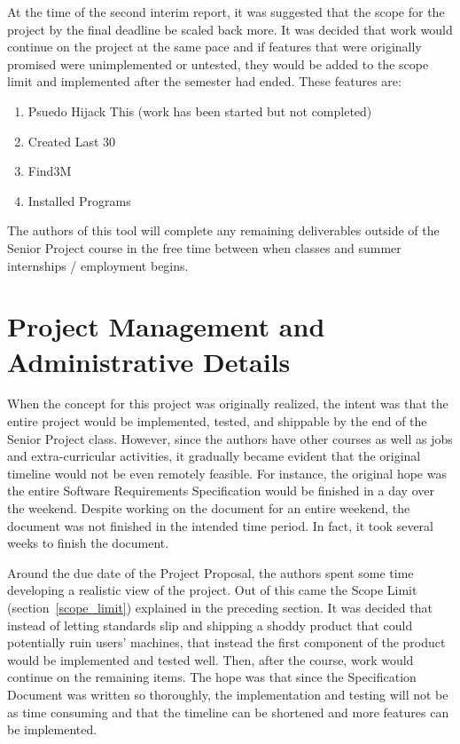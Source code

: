 \documentclass[letterpaper,12pt]{article}
\begin{document}
At the time of the second interim report, it was suggested that the scope for
the project by the final deadline be scaled back more.  It was decided that work
would continue on the project at the same pace and if features that were
originally promised were unimplemented or untested, they would be added to the
scope limit and implemented after the semester had ended.  These features are:
\begin{enumerate}
  \item Psuedo Hijack This (work has been started but not completed)
  \item Created Last 30
  \item Find3M
  \item Installed Programs
\end{enumerate}

The authors of this tool will complete any remaining deliverables outside of the
Senior Project course in the free time between when classes and summer
internships / employment begins.  

\newpage



\section{Project Management and Administrative Details}
\label{project_management} 
When the concept for this project was originally realized, the intent was that
the entire project would be implemented, tested, and shippable by the end of the
Senior Project class.  However, since the authors have other courses as well as
jobs and extra-curricular activities, it gradually became evident that the
original timeline would not be even remotely feasible.  For instance, the
original hope was the entire Software Requirements Specification
\cite{Specification} would be finished in a day over the weekend.  Despite
working on the document for an entire weekend, the document was not finished in
the intended time period.  In fact, it took several weeks to finish the
document.  

Around the due date of the Project Proposal, the authors spent some time
developing a realistic view of the project.  Out of this came the Scope Limit
(section~\ref{scope_limit}) explained in the preceding section.  It was decided
that instead of letting standards slip and shipping a shoddy product that could
potentially ruin users' machines, that instead the first component of the
product would be implemented and tested well.  Then, after the course, work
would continue on the remaining items.  The hope was that since the
Specification Document was written so thoroughly, the implementation and testing
will not be as time consuming and that the timeline can be shortened and more
features can be implemented.
\end{document}
